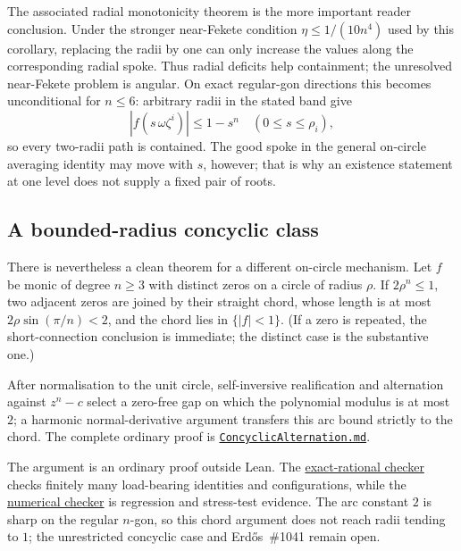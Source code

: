 \documentclass[11pt]{article}
\begin{document}
The associated radial monotonicity theorem is the more important reader
conclusion.  Under the stronger near-Fekete condition
$\eta\le1/(10n^4)$ used by this corollary, replacing the radii by one can only
increase the values along the corresponding radial spoke.  Thus
radial deficits help containment; the unresolved near-Fekete problem is
angular.  On exact regular-gon directions this becomes unconditional for
$n\le6$: arbitrary radii in the stated band give
\[
 |f(s\,\omega\zeta^i)|\le1-s^n
 \quad(0\le s\le\rho_i),
\]
so every two-radii path is contained.  The good spoke in the general
on-circle averaging identity may move with $s$, however; that is why an
existence statement at one level does not supply a fixed pair of roots.

\subsection*{A bounded-radius concyclic class}

There is nevertheless a clean theorem for a different on-circle mechanism.
Let $f$ be monic of degree $n\ge3$ with distinct zeros on a circle of radius
$\rho$.  If $2\rho^n\le1$, two adjacent zeros are joined by their straight
chord, whose length is at most $2\rho\sin(\pi/n)<2$, and the chord lies in
$\{|f|<1\}$.  (If a zero is repeated, the short-connection conclusion is
immediate; the distinct case is the substantive one.)

After normalisation to
the unit circle, self-inversive realification and alternation against $z^n-c$
select a zero-free gap on which the polynomial modulus is at most $2$; a
harmonic normal-derivative argument transfers this arc bound strictly to the
chord.  The complete ordinary proof is
\href{https://github.com/wcook04/plectis-erdos/blob/f214a6b45528dc5eefe20ffadc35f2e981627d4c/research_corpus/Erdos1041/ConcyclicAlternation.md}{\texttt{ConcyclicAlternation.md}}.

The argument is an ordinary proof outside Lean.  The
\href{https://github.com/wcook04/plectis-erdos/blob/f214a6b45528dc5eefe20ffadc35f2e981627d4c/research_corpus/Erdos1041/scripts/check_erdos1041_concyclic_exact_witness.py}{exact-rational checker}
checks finitely many load-bearing identities and configurations, while the
\href{https://github.com/wcook04/plectis-erdos/blob/f214a6b45528dc5eefe20ffadc35f2e981627d4c/research_corpus/Erdos1041/scripts/check_erdos1041_concyclic_alternation.py}{numerical checker}
is regression and stress-test evidence.  The arc constant $2$ is sharp on the
regular $n$-gon, so this chord argument does not reach radii tending to $1$;
the unrestricted concyclic case and Erd\H{o}s~\#1041 remain open.
\end{document}
